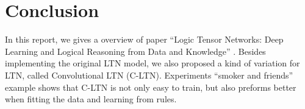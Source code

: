 
\section{Conclusion}

In this report, we gives a overview of paper ``Logic Tensor Networks: Deep Learning and Logical Reasoning from Data and Knowledge'' \cite{serafini2016logic}.
Besides implementing the original LTN model, we also proposed a kind of variation for LTN, called Convolutional LTN (C-LTN). Experiments ``smoker and friends'' example shows that C-LTN is not only easy to train, but also preforms better when fitting the data and learning from rules.
